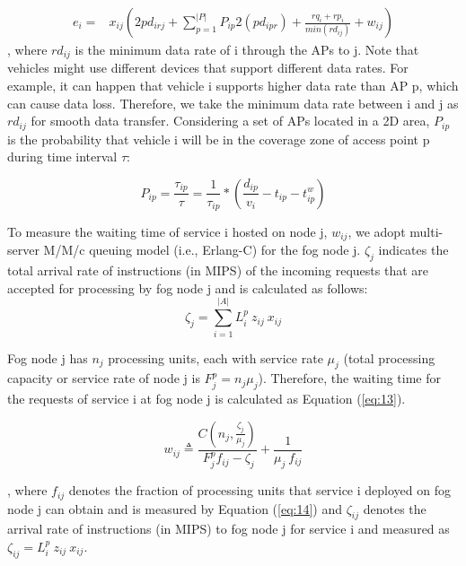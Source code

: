 \documentclass[twocolumn]{article}
\begin{document}
\begin{equation}
\begin{aligned}
e_{i} = &x_{ij}(2pd_{irj}+\sum_{p=1}^{|P|}P_{ip}2(pd_{ipr})+\frac{rq_{i}+rp_{i}}{min(rd_{ij})}+w_{ij})
\end{aligned}
\label{eq:9}
\end{equation}
, where $rd_{ij}$ is the minimum data rate of i through the APs to j. Note that vehicles might use different devices that support different data rates. For example, it can happen that vehicle i supports higher data rate than AP p, which can cause data loss. Therefore, we take the minimum data rate between i and j as $rd_{ij}$ for smooth data transfer. Considering a set of APs located in a 2D area, $P_{ip}$ is the probability that vehicle i will be in the coverage zone of access point p during time interval $\tau$\cite{djemai2020mobility}:

\begin{equation}
P_{ip} = \frac{\tau_{ip}}{\tau} = \frac{1}{{\tau}_{ip}}*(\frac{{d}_{ip}}{v_{i}}-t_{ip}-t^{w}_{ip})
\label{eq:6.1}
\end{equation}

\par To measure the waiting time of service i hosted on node j, $w_{ij}$, we adopt multi-server M/M/c queuing model (i.e., Erlang-C\cite{gautam2012analysis})\cite{liu2019joint,zhou2018air,jia2015optimal} for the fog node j. $\zeta_{j}$ indicates the total arrival rate of instructions (in MIPS) of the incoming requests that are accepted for processing by fog node j and is calculated as follows:
\begin{equation}
\zeta_{j} = \sum_{i=1}^{|A|} L_{i}^{p} \ z_{ij} \ x_{ij}  
\label{eq:12}
\end{equation}
\par Fog node j has $n_{j}$ processing units, each with service rate $\mu_{j}$ (total processing capacity or service rate of node j is $F^{p}_{j} = n_{j} \mu_{j}$). Therefore, the waiting time for the requests of service i at fog node j is calculated as Equation (\ref{eq:13})\cite{bolch2006queueing}.

\begin{equation}
w_{ij} \triangleq  
\frac{C(n_{j},\frac{\zeta_{j}}{\mu_{j}})}{\ F^{p}_{j} f_{ij}-\zeta_{j}}+
\frac{1}{\mu_{j} \ f_{ij}}
\label{eq:13}
\end{equation}

, where $f_{ij}$ denotes the fraction of processing units that service i deployed on fog node j can obtain and is measured by Equation (\ref{eq:14}) and $\zeta_{ij}$ denotes the arrival rate of instructions (in MIPS) to fog node j for service i and measured as $\zeta_{ij} = L_{i}^{p} \ z_{ij} \ x_{ij}$.
 
\end{document}
